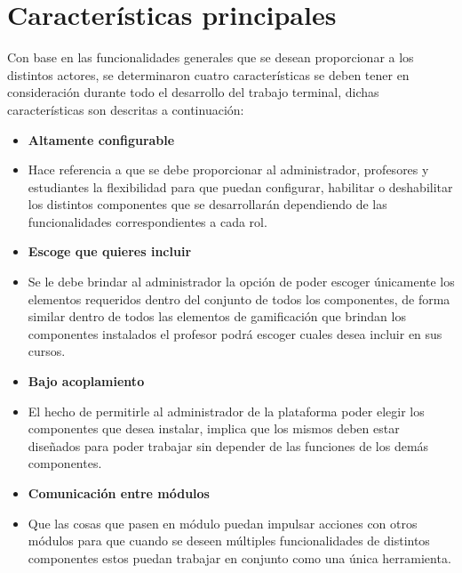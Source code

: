 \section{Características principales}

 Con base en las funcionalidades generales que se desean proporcionar a los distintos
 actores, se determinaron cuatro características se deben tener en consideración durante
 todo el desarrollo del trabajo terminal, dichas características son descritas a continuación:


    \begin{multicols}{2}
    \begin{itemize}
    \item{\bf\color{primary} Altamente configurable }

    \item[] Hace referencia a que se debe proporcionar al administrador, profesores
            y estudiantes la flexibilidad para que puedan configurar, habilitar o deshabilitar
            los distintos componentes que se desarrollarán dependiendo de las funcionalidades
            correspondientes a cada rol.

    \item{\bf\color{primary} Escoge que quieres incluir }

    \item[] Se le debe brindar al administrador la opción de poder escoger únicamente los
            elementos requeridos dentro del conjunto de todos los componentes, de forma similar
            dentro de todos las elementos de gamificación que brindan los componentes instalados
            el profesor podrá escoger cuales desea incluir en sus cursos.


    \item{\bf\color{primary} Bajo acoplamiento }

    \item[] El hecho de permitirle al administrador de la plataforma poder elegir los
            componentes que desea instalar, implica que los mismos deben estar diseñados
            para poder trabajar sin depender de las funciones de los demás componentes.

    \item{\bf\color{primary} Comunicación entre módulos }

    \item[] Que las cosas que pasen en módulo puedan impulsar acciones con otros módulos
            para que cuando se deseen múltiples funcionalidades de distintos componentes
            estos puedan trabajar en conjunto como una única herramienta.
    \end{itemize}
    \end{multicols}

